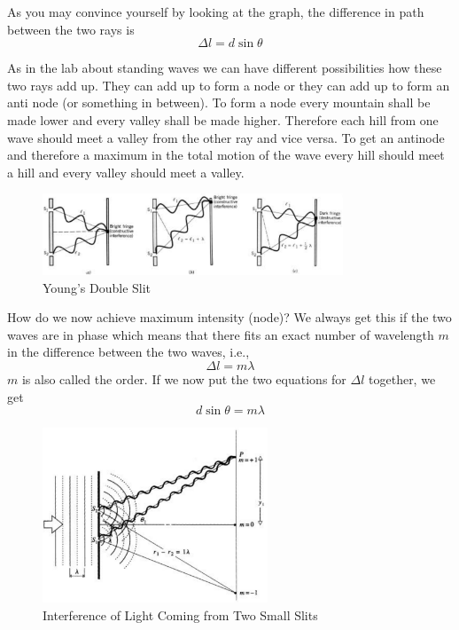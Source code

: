 As you may convince yourself by looking at the graph, the difference in path between the two rays is
\begin{equation}
  \Delta l =d\sin\theta
\end{equation}

As in the lab about standing waves we can have different possibilities how these two rays add up. They can add up to form a node or they can add up to form an anti node (or something in between). To form a node every mountain shall be made lower and every valley shall be made higher. Therefore each hill from one wave should meet a valley from the other ray and vice versa. To get an antinode and therefore a maximum in the total motion of the wave every hill should meet a hill and every valley should meet a valley.
\begin{figure}[h]
\centering
\includegraphics[width=0.8\textwidth]{./Exp9/pic/image2.png}
\caption{Young's Double Slit}
\end{figure}

How do we now achieve maximum intensity (node)? We always get this if the two waves are in phase which means that there fits an exact number of wavelength $m$ in the difference between the two waves, i.e.,
\begin{equation}
  \Delta l=m\lambda
\end{equation}
$m$ is also called the order. If we now put the two equations for $\Delta l$ together, we get
\begin{equation}
  d\sin\theta=m\lambda
  \label{eq:dsin}
\end{equation}
\begin{figure}[h]
\centering
\includegraphics[width=0.6\textwidth]{./Exp9/pic/image3.png}
\caption{Interference of Light Coming from Two Small Slits}
\end{figure}

